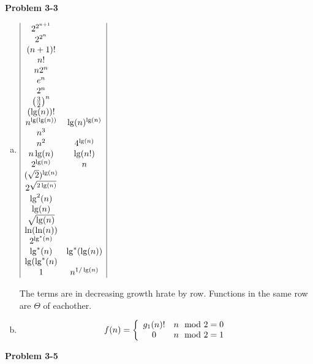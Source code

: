 \documentclass{article}
\begin{document}
\noindent\textbf{Problem 3-3}\\
\begin{enumerate}[a)]
\item
$
\begin{array}{|c c|}
2^{2^{n+1}}&\\
2^{2^n}&\\
(n+1)!&\\
n!&\\
n2^n&\\
e^n&\\
2^n&\\
\left(\frac{3}{2}\right)^n&\\
(\lg(n))!&\\
 n^{\lg(\lg(n))}&\lg(n)^{\lg(n)}\\
 n^3&\\
  n^2& 4^{\lg(n)}\\
  n\lg(n)&\lg(n!)\\
  2^{\lg(n)}&n\\
  (\sqrt{2})^{\lg(n)}&\\
  2^{\sqrt{2\lg(n)}}&\\
  \lg^2(n)&\\
  \lg(n)&\\
  \sqrt{\lg(n)}&\\
  \ln(\ln(n))&\\
  2^{\lg^*(n)}&\\
  \lg^*(n) &\lg^*(\lg(n))\\
  \lg(\lg^*(n)&\\
  1&n^{1/\lg(n)}

\end{array}
$


The terms are in decreasing growth hrate by row. Functions in the same row are $\Theta$ of eachother.
\item

\[
f(n) = \left\{\begin{array}{c c}g_1(n)!& n\mod 2=0 \\0 &n\mod 2 =1\end{array}\right.
\]
\end{enumerate}

\noindent\textbf{Problem 3-5}\\
\end{document}
